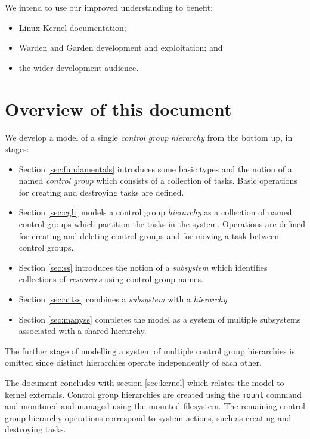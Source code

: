 \documentclass[a4paper,twoside,12pt]{article}
\begin{document}
We intend to use our improved understanding to benefit:
\begin{itemize}
\item Linux Kernel documentation;
\item Warden\cite{warden} and Garden\cite{garden} development and exploitation; and
\item the wider development audience.
\end{itemize}

\section{Overview of this document}

We develop a model of a single \emph{control group hierarchy} from the bottom up, in stages:
\begin{itemize}

\item Section \ref{sec:fundamentals} introduces some basic types and the notion of a named \emph{control group} which consists of a
collection of tasks. Basic operations for creating and destroying tasks are defined.

\item  Section \ref{sec:cgh} models a control group \emph{hierarchy} as a collection of named control groups which partition the tasks
in the system. Operations are defined for creating and deleting control groups and for moving a task between control groups.

\item Section \ref{sec:ss} introduces the notion of a \emph{subsystem} which identifies collections of \emph{resources} using control group names.

\item Section \ref{sec:attss} combines a \emph{subsystem} with a \emph{hierarchy}.

\item Section \ref{sec:manyss} completes the model as a system of multiple subsystems associated with a shared hierarchy.

\end{itemize}
The further stage of modelling a system of multiple control group hierarchies is omitted since distinct hierarchies operate independently of each other.

The document concludes with section \ref{sec:kernel} which relates the model to kernel externals. 
Control group hierarchies are created using the \texttt{mount} command and monitored and managed using the mounted filesystem. 
The remaining control group hierarchy operations correspond to system actions, such as creating and destroying tasks.
\end{document}
